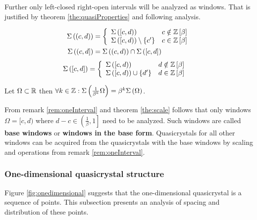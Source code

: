 \documentclass[text.tex]{subfiles}
\begin{document}
\begin{remark}
\label{rem:oneInterval}
Further only left-closed right-open intervals will be analyzed as windows. That is justified by theorem \ref{the:quasiProperties} and following analysis.
%
\begin{multicols}{2}
\noindent\begin{align*}
\Sigma\left((c,d)\right) &= \left\{ 
	\begin{array}{l l}
	\Sigma\left([c,d)\right) & c \notin \mathbb{Z}\left[\beta\right]\\
	\Sigma\left([c,d)\right)\setminus\{c'\} & c \in \mathbb{Z}\left[\beta\right]
	\end{array} \right.\\
\Sigma\left((c,d]\right) &= \Sigma\left((c,d)\right)\cap\Sigma\left([c,d]\right)
\end{align*}
\begin{align*}
\Sigma\left([c,d]\right) &= \left\{ 
	\begin{array}{l l}
	\Sigma\left([c,d)\right) & d \notin \mathbb{Z}\left[\beta\right]\\
	\Sigma\left([c,d)\right)\cup\{d'\} & d \in \mathbb{Z}\left[\beta\right]
	\end{array} \right.
\end{align*}
\end{multicols}
%
\end{remark}

\begin{theorem}
\label{the:scale}
Let $\Omega \subset \mathbb{R}$ then $\forall k\in \mathbb{Z}: \Sigma\left(\frac{1}{\beta^k}\Omega\right) = \beta^k\Sigma\left(\Omega\right)$.
\end{theorem}

\begin{corollary}
\label{cor:baseInterval}
From remark \ref{rem:oneInterval} and theorem \ref{the:scale} follows that only windows $\Omega = [c,d)$ where $d-c\in\left( \frac{1}{\beta}, 1 \right]$ need to be analyzed. Such windows are called \textbf{base windows} or \textbf{windows in the base form}. Quasicrystals for all other windows can be acquired from the quasicrystals with the base windows by scaling and operations from remark \ref{rem:oneInterval}.
\end{corollary}

\subsubsection{One-dimensional quasicrystal structure}%

Figure \ref{fig:onedimensional} suggests that the one-dimensional quasicrystal is a sequence of points. This subsection presents an analysis of spacing and distribution of these points.
\end{document}
